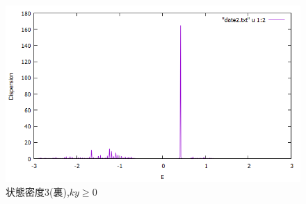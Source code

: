 \documentclass{jsarticle}
\begin{document}
			\begin{figure}[H]
				\centering
				\includegraphics[scale=0.5]{LDOS3d_bry.png}
				\caption{状態密度3(裏),$ky\geq0$}
				\label{LDOS3d}
			\end{figure}
			
    
\end{document}
